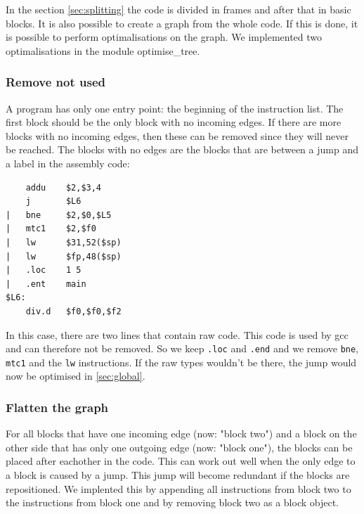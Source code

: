 \lstset{ %
language=[mips]Assembler,         %
}
In the section \ref{sec:splitting} the code is divided in frames and after
that in basic blocks. It is also possible to create a graph from the whole code.
If this is done, it is possible to perform optimalisations on the graph. We 
implemented two optimalisations in the module optimise\_tree.
\subsubsection{Remove not used}
A program has only one entry point: the beginning of the instruction list. The 
first block should be the only block with no incoming edges. If there are more
blocks with no incoming edges, then these can be removed since they will never 
be reached. The blocks with no edges are the blocks that are between a jump
and a label in the assembly code:
\begin{lstlisting}
    addu    $2,$3,4
    j       $L6
|   bne     $2,$0,$L5
|   mtc1    $2,$f0
|   lw      $31,52($sp)
|   lw      $fp,48($sp)
|   .loc    1 5
|   .ent    main        
$L6:
    div.d   $f0,$f0,$f2	
\end{lstlisting}
In this case, there are two lines that contain raw code. This code is used by
gcc and can therefore not be removed. So we keep \texttt{.loc} and \texttt{.end} 
and we remove \texttt{bne}, \texttt{mtc1} and the \texttt{lw} instructions. If
the raw types wouldn't be there, the jump would now be optimised in 
\ref{sec:global}.
\subsubsection{Flatten the graph}
For all blocks that have one incoming edge (now: "block two") and a block on the 
other side that has only one outgoing edge (now: "block one"), the blocks can 
be placed after eachother in the code. This can work out well when the only 
edge to a block is caused by a jump. This jump will become redundant if the 
blocks are repositioned. We implented this by appending all instructions from 
block two to the instructions from block one and by removing block two as a 
block object. 

